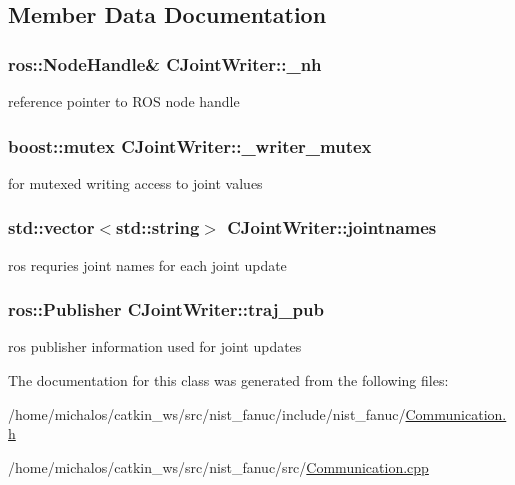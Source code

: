 \subsection{Member Data Documentation}
\hypertarget{classCJointWriter_af65e697d4e7fdfe1f17e16b47ab52817}{
\subsubsection[{\-\_\-nh}]{\setlength{\rightskip}{0pt plus 5cm}ros\-::\-Node\-Handle\& C\-Joint\-Writer\-::\-\_\-nh}}\label{classCJointWriter_af65e697d4e7fdfe1f17e16b47ab52817}
reference pointer to R\-O\-S node handle \hypertarget{classCJointWriter_a1f005dcb6f32e6d161026a6cdda5b66f}{
\subsubsection[{\-\_\-writer\-\_\-mutex}]{\setlength{\rightskip}{0pt plus 5cm}boost\-::mutex C\-Joint\-Writer\-::\-\_\-writer\-\_\-mutex\hspace{0.3cm}{\ttfamily [static]}}}\label{classCJointWriter_a1f005dcb6f32e6d161026a6cdda5b66f}
for mutexed writing access to joint values \hypertarget{classCJointWriter_a3aceb4ba37d60a52c34e486871bc8f58}{
\subsubsection[{jointnames}]{\setlength{\rightskip}{0pt plus 5cm}std\-::vector$<$std\-::string$>$ C\-Joint\-Writer\-::jointnames}}\label{classCJointWriter_a3aceb4ba37d60a52c34e486871bc8f58}
ros requries joint names for each joint update \hypertarget{classCJointWriter_a109841588bf726b430b82a509176bb0c}{
\subsubsection[{traj\-\_\-pub}]{\setlength{\rightskip}{0pt plus 5cm}ros\-::\-Publisher C\-Joint\-Writer\-::traj\-\_\-pub}}\label{classCJointWriter_a109841588bf726b430b82a509176bb0c}
ros publisher information used for joint updates 

The documentation for this class was generated from the following files\-:\begin{DoxyCompactItemize}
\item 
/home/michalos/catkin\-\_\-ws/src/nist\-\_\-fanuc/include/nist\-\_\-fanuc/\hyperlink{Communication_8h}{Communication.\-h}\item 
/home/michalos/catkin\-\_\-ws/src/nist\-\_\-fanuc/src/\hyperlink{Communication_8cpp}{Communication.\-cpp}\end{DoxyCompactItemize}
